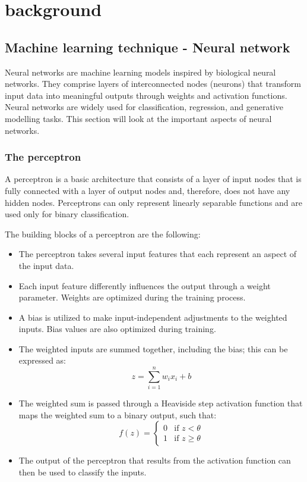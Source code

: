 \section{background}



	\subsection{Machine learning technique - Neural network}

		
		Neural networks are machine learning models inspired by biological neural networks. They comprise layers of interconnected nodes (neurons) that transform input data into meaningful outputs through weights and activation functions. Neural networks are widely used for classification, regression, and generative modelling tasks. This section will look at the important aspects of neural networks.
		
		
		\bigskip
		\subsubsection{The perceptron}
				
		A perceptron is a basic architecture that consists of a layer of input nodes that is fully connected with a layer of output nodes and, therefore, does not have any hidden nodes. Perceptrons can only represent linearly separable functions and are used only for binary classification.
		
		The building blocks of a perceptron are the following:
		

		\begin{itemize}
			\item The perceptron takes several input features that each represent an aspect of the input data.
			\item Each input feature differently influences the output through a weight parameter. Weights are optimized during the training process.
			\item A bias is utilized to make input-independent adjustments to the weighted inputs. Bias values are also optimized during training.
			\item The weighted inputs are summed together, including the bias; this can be expressed as:
			\begin{equation}
				z = \sum_{i=1}^n w_i x_i + b
			\end{equation}

			\item The weighted sum is passed through a Heaviside step activation function that maps the weighted sum to a binary output, such that:
			$$
			f(z) = 
			\begin{cases} 
				0 & \text{if } z < \theta \\ 
				1 & \text{if } z \geq \theta
			\end{cases}
			$$
			\item The output of the perceptron that results from the activation function can then be used to classify the inputs.
		\end{itemize}
		\bigskip


